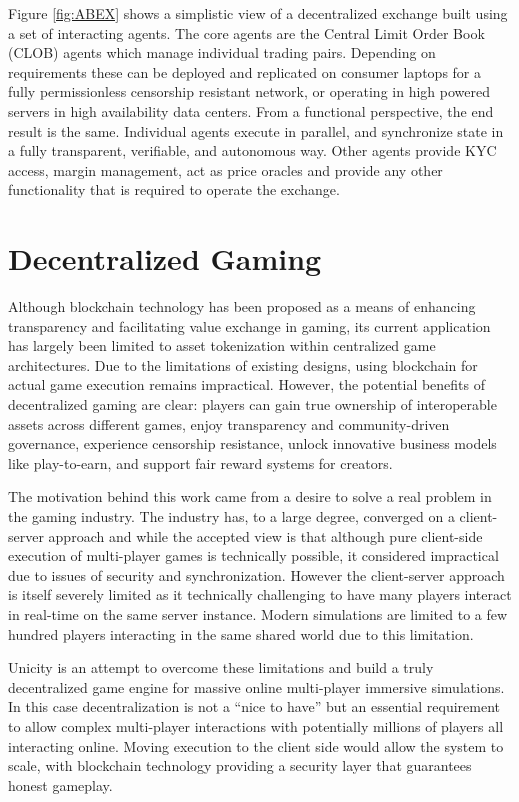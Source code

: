 \documentclass{article}
\begin{document}
 
Figure \ref{fig:ABEX} shows a simplistic view of a decentralized exchange built using a set of interacting agents. The core agents are the Central Limit Order Book (CLOB) agents which manage individual trading pairs. Depending on requirements these can be deployed and replicated on consumer laptops for a fully permissionless censorship resistant network, or operating in high powered servers in high availability data centers. From a functional perspective, the end result is the same. Individual agents execute in parallel, and synchronize state in a fully transparent, verifiable, and autonomous way. Other agents provide KYC access, margin management, act as price oracles and provide any other functionality that is required to operate the exchange. 


\section{Decentralized Gaming}

Although blockchain technology has been proposed as a means of enhancing transparency and facilitating value exchange in gaming, its current application has largely been limited to asset tokenization within centralized game architectures. Due to the limitations of existing designs, using blockchain for actual game execution remains impractical. However, the potential benefits of decentralized gaming are clear: players can gain true ownership of interoperable assets across different games, enjoy transparency and community-driven governance, experience censorship resistance, unlock innovative business models like play-to-earn, and support fair reward systems for creators.

\vspace{2mm} 
The motivation behind this work came from a desire to solve a real problem in the gaming industry. The industry has, to a large degree, converged on a client-server approach and while the accepted view is that although pure client-side execution of multi-player games is technically possible, it considered impractical due to issues of security and synchronization. However the client-server approach is itself severely limited as it technically challenging to have many players interact in real-time on the same server instance. Modern simulations are limited to a few hundred players interacting in the same shared world due to this limitation.
\vspace{2mm}

Unicity is an attempt to overcome these limitations and build a truly decentralized game engine for massive online multi-player immersive simulations. In this case decentralization is not a “nice to have” but an essential requirement to allow complex multi-player interactions with potentially millions of players all interacting online. Moving execution to the client side would allow the system to scale, with blockchain technology providing a security layer that guarantees honest gameplay. 
\end{document}
